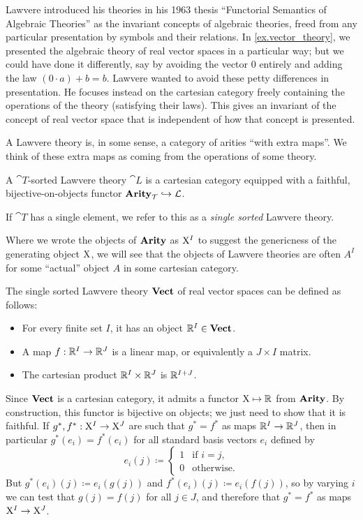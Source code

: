 \documentclass[DynamicalBook]{subfiles}
\begin{document}
Lawvere introduced his theories in his 1963 thesis ``Functorial Semantics of
Algebraic Theories'' \cite{} as the invariant concepts of algebraic theories,
freed from any particular presentation by symbols and their relations. In
\cref{ex.vector_theory}, we presented the algebraic theory of real vector spaces
in a particular way; but we could have done it differently, say by avoiding the
vector $0$
entirely and adding the law $(0 \cdot a) + b = b$. Lawvere wanted to avoid these
petty differences in presentation. He focuses
instead on the cartesian category freely
containing the operations of the theory (satisfying their laws). This gives an invariant
of the concept of real vector space that is independent of how that concept is presented.

A Lawvere theory is, in some sense, a category of arities ``with extra maps''.
We think of these extra maps as coming from the operations of some theory.
\begin{definition}
A $\cat{T}$-sorted Lawvere theory $\cat{L}$ is a cartesian category equipped with a
faithful, bijective-on-objects functor $\textbf{Arity}_{\mathcal{T}} \hookrightarrow
\mathcal{L}$. 

If $\cat{T}$ has a single element, we refer to this as a \emph{single sorted}
Lawvere theory.
\end{definition}

Where we wrote the objects of $\textbf{Arity}$ as $\mathrm{X}^I$ to suggest the genericness of
the generating object $\mathrm{X}$, we will see that the objects
of Lawvere theories are often $A^I$ for some ``actual'' object $A$ in some
cartesian category.
\begin{example}
  The single sorted Lawvere theory $\textbf{Vect}$ of real vector spaces can be defined as follows:
  \begin{itemize}
    \item For every finite set $I$, it has an object $\mathbb{R}^I \in \textbf{Vect}$.
    \item A map $f : \mathbb{R}^I \to \mathbb{R}^J$ is a linear map, or equivalently a $J
      \times I$ matrix.
    \item The cartesian product $\mathbb{R}^I \times \mathbb{R}^J$ is $\mathbb{R}^{I + J}$.
 \end{itemize}

 Since $\textbf{Vect}$ is a cartesian category, it admits a functor $\mathrm{X} \mapsto
 \mathbb{R}$ from $\textbf{Arity}$. By construction, this functor is bijective on objects; we
 just need to show that it is faithful. If $g^{\ast}, f^{\ast} : \mathrm{X}^I \to
 \mathrm{X}^J$ are such that $g^{\ast} = f^{\ast}$ as maps $\mathbb{R}^I \to \mathbb{R}^J$, then in
 particular $g^{\ast}(e_i) =f^{\ast}(e_i)$ for all standard basis vectors $e_i$
 defined by
\[
e_i(j) \coloneqq \begin{cases} 1 &\mbox{if $i = j$,} \\0 &\mbox{otherwise.} \end{cases}
\]
But $g^{\ast}(e_i)(j) \coloneqq e_i(g(j))$ and $f^{\ast}(e_i)(j) \coloneqq
e_i(f(j))$, so by varying $i$ we can test that $g(j) = f(j)$ for all $j \in J$,
and therefore that $g^{\ast} = f^{\ast}$ as maps $\mathrm{X}^I \to \mathrm{X}^J$.
\end{example}
\end{document}
